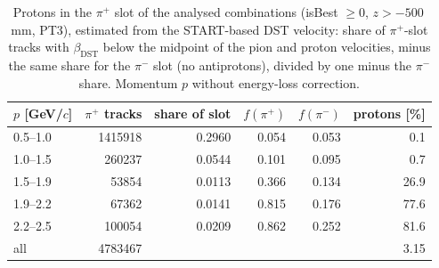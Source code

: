 \begin{table}[H]
\centering
\caption{Protons in the $\pi^+$ slot of the analysed combinations (isBest $\geq 0$, $z>-500$\,mm, PT3), estimated from the START-based DST velocity: share of $\pi^+$-slot tracks with $\beta_{\mathrm{DST}}$ below the midpoint of the pion and proton velocities, minus the same share for the $\pi^-$ slot (no antiprotons), divided by one minus the $\pi^-$ share. Momentum $p$ without energy-loss correction.}
\label{tab:pid_pip_protons}
\footnotesize
\begin{tabular}{@{}l r r r r r@{}}
\toprule
$p$ [GeV/$c$] & $\pi^+$ tracks & share of slot & $f(\pi^+)$ & $f(\pi^-)$ & protons [\%] \\
\midrule
0.5--1.0 & 1415918 & 0.2960 & 0.054 & 0.053 & 0.1 \\
1.0--1.5 & 260237 & 0.0544 & 0.101 & 0.095 & 0.7 \\
1.5--1.9 & 53854 & 0.0113 & 0.366 & 0.134 & 26.9 \\
1.9--2.2 & 67362 & 0.0141 & 0.815 & 0.176 & 77.6 \\
2.2--2.5 & 100054 & 0.0209 & 0.862 & 0.252 & 81.6 \\
\midrule
all & 4783467 & & & & 3.15 \\
\bottomrule
\end{tabular}
\end{table}
